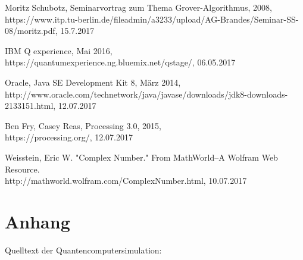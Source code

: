 \documentclass[12pt]{report}
\begin{document}
\begin{thebibliography}{9}
Moritz Schubotz, Seminarvortrag zum Thema Grover-Algorithmus, 2008, https://www.itp.tu-berlin.de/fileadmin/a3233/upload/AG-Brandes/Seminar-SS-08/moritz.pdf, 15.7.2017





IBM Q experience, Mai 2016,
\\https://quantumexperience.ng.bluemix.net/qstage/, 06.05.2017

Oracle, Java SE Development Kit 8, März 2014,
\\http://www.oracle.com/technetwork/java/javase/downloads/jdk8-downloads-2133151.html, 12.07.2017

Ben Fry, Casey Reas, Processing 3.0, 2015,
\\https://processing.org/, 12.07.2017

Weisstein, Eric W. "Complex Number." From MathWorld--A Wolfram Web Resource.
\\http://mathworld.wolfram.com/ComplexNumber.html, 10.07.2017
\end{thebibliography}

\newpage

\chapter*{Anhang}

Quelltext der Quantencomputersimulation:\\
\end{document}
